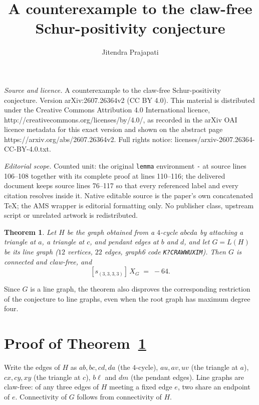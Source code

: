 \documentclass[10pt,a4paper]{amsart}
\newtheorem{theorem}{Theorem}
\newcommand{\csf}{X}
\begin{document}
\title[A counterexample to the claw-free Schur-positivity conjectur]{A counterexample to the claw-free Schur-positivity conjecture}
\author{Jitendra Prajapati}
\date{}
\maketitle
\noindent\emph{Source and licence.} A counterexample to the claw-free Schur-positivity conjecture. Version arXiv:2607.26364v2 (CC BY 4.0). This material is distributed under the Creative Commons Attribution 4.0 International licence, http://creativecommons.org/licenses/by/4.0/, as recorded in the arXiv OAI licence metadata for this exact version and shown on the abstract page https://arxiv.org/abs/2607.26364v2. Full rights notice: licenses/arxiv-2607.26364-CC-BY-4.0.txt.\par\smallskip
\noindent\textit{Editorial scope.} Counted unit: the original \texttt{lemma} environment \texttt{-} at source lines 106--108 together with its complete proof at lines 110--116; the delivered document keeps source lines 76--117 so that every referenced label and every citation resolves inside it. Native editable source is the paper's own concatenated TeX; the AMS wrapper is editorial formatting only. No publisher class, upstream script or unrelated artwork is redistributed.
\begin{theorem}\label{thm:main}
Let $H$ be the graph obtained from a $4$-cycle $abcda$ by attaching a
triangle at $a$, a triangle at $c$, and pendant edges at $b$ and $d$, and
let $G = L(H)$ be its line graph ($12$ vertices, $22$ edges, graph6 code
\texttt{K?\textasciigrave CRAWWUXIM}). Then $G$ is connected and claw-free,
and
\[
[s_{(3,3,3,3)}]\,\csf_G \;=\; -64 .
\]
\end{theorem}

Since $G$ is a line graph, the theorem also disproves the corresponding
restriction of the conjecture to line graphs, even when the root graph has
maximum degree four.

\section{Proof of Theorem~\ref{thm:main}}

Write the edges of $H$ as
$ab, bc, cd, da$ (the $4$-cycle), $au, av, uv$ (the triangle at $a$),
$cx, cy, xy$ (the triangle at $c$), $b\ell$ and $dm$ (the pendant edges).
Line graphs are claw-free: of any three edges of $H$ meeting a fixed edge
$e$, two share an endpoint of $e$. Connectivity of $G$ follows from
connectivity of $H$.
\end{document}
